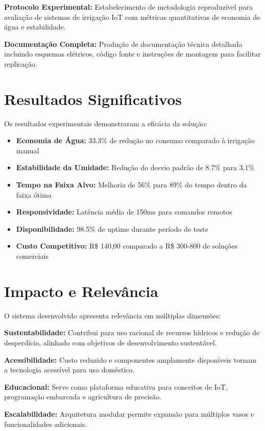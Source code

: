\documentclass[twoside,english,brazilian]{UNISINOSmonografia}
\begin{document}
\textbf{Protocolo Experimental:} Estabelecimento de metodologia reproduzível para avaliação de sistemas de irrigação IoT com métricas quantitativas de economia de água e estabilidade.

\textbf{Documentação Completa:} Produção de documentação técnica detalhada incluindo esquemas elétricos, código fonte e instruções de montagem para facilitar replicação.

\section{Resultados Significativos}

Os resultados experimentais demonstraram a eficácia da solução:

\begin{itemize}
    \item \textbf{Economia de Água:} 33.3\% de redução no consumo comparado à irrigação manual
    \item \textbf{Estabilidade da Umidade:} Redução do desvio padrão de 8.7\% para 3.1\%
    \item \textbf{Tempo na Faixa Alvo:} Melhoria de 56\% para 89\% do tempo dentro da faixa ótima
    \item \textbf{Responsividade:} Latência média de 150ms para comandos remotos
    \item \textbf{Disponibilidade:} 98.5\% de uptime durante período de teste
    \item \textbf{Custo Competitivo:} R\$ 140,00 comparado a R\$ 300-800 de soluções comerciais
\end{itemize}

\section{Impacto e Relevância}

O sistema desenvolvido apresenta relevância em múltiplas dimensões:

\textbf{Sustentabilidade:} Contribui para uso racional de recursos hídricos e redução de desperdício, alinhado com objetivos de desenvolvimento sustentável.

\textbf{Acessibilidade:} Custo reduzido e componentes amplamente disponíveis tornam a tecnologia acessível para uso doméstico.

\textbf{Educacional:} Serve como plataforma educativa para conceitos de IoT, programação embarcada e agricultura de precisão.

\textbf{Escalabilidade:} Arquitetura modular permite expansão para múltiplos vasos e funcionalidades adicionais.
\end{document}
